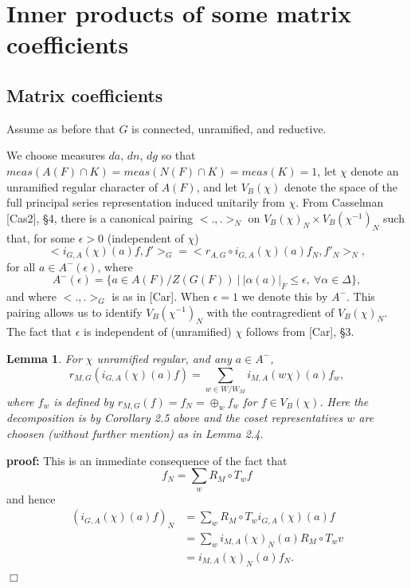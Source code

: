 \documentclass[12pt]{article}
\newtheorem{lemma}{Lemma}[section]
\newenvironment{pf}[1][proof:]{\par\medskip\noindent\textbf{#1} }{\par\medskip}
\begin{document}
\section{Inner products of some matrix coefficients}

\subsection{Matrix coefficients}

Assume as before that $G$ is connected, unramified, and reductive.

We choose measures $da$, $dn$, $dg$ so that $meas(A(F)\cap K)=meas(N(F)\cap K)=meas(K)=1$, let $\chi$ denote an unramified regular character of $A(F)$, and let $V_B(\chi)$ denote the space of the full principal series representation induced unitarily from $\chi$. From Casselman [Cas2], \S4, there is a canonical pairing $<.,.>_N$ on $V_B(\chi)_N\times V_B(\chi^{-1})_N$ such that, for some $\epsilon>0$ (independent of $\chi$)
\begin{equation}\tag{3.1}
<i_{G,A}(\chi)(a)f,f'>_G=<r_{A,G}\circ i_{G,A}(\chi)(a)f_N,f'_N>_N,
\end{equation}
for all $a\in A^-(\epsilon)$, where
\[
A^-(\epsilon)=\{a\in A(F)/Z(G(F))\ |\ |\alpha(a)|_F\leq\epsilon,\ \forall\alpha\in\Delta\},
\]
and where $<.,.>_G$ is as in [Car]. When $\epsilon=1$ we denote this by $A^-$. This pairing allows us to identify $V_B(\chi^{-1})_N$ with the contragredient of $V_B(\chi)_N$. The fact that $\epsilon$ is independent of (unramified) $\chi$ follows from [Car], \S3.

\begin{lemma}
For $\chi$ unramified regular, and any $a\in A^-$,
\[
r_{M,G}(i_{G,A}(\chi)(a)f)=\sum_{w\in W/W_M}i_{M,A}(w\chi)(a)f_w,
\]
where $f_w$ is defined by $r_{M,G}(f)=f_N=\oplus_wf_w$ for $f\in V_B(\chi)$. Here the decomposition is by Corollary 2.5 above and the coset representatives $w$ are choosen (without further mention) as in Lemma 2.4.
\end{lemma}

\begin{pf}
This is an immediate consequence of the fact that
\begin{equation}\tag{3.2}
f_N=\sum_wR_M\circ T_wf
\end{equation}
and hence
\[
\begin{array}{rl}
(i_{G,A}(\chi)(a)f)_N&=\sum_wR_M\circ T_wi_{G,A}(\chi)(a)f\\
&=\sum_wi_{M,A}(\chi)_N(a)R_M\circ T_wv\\
&=i_{M,A}(\chi)_N(a)f_N.
\end{array}
\]
$\Box$
\end{pf}
\end{document}
